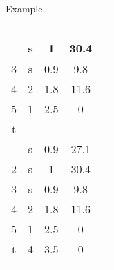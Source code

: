 \begin{frame}{Example}
\begin{columns}[c]
{\begin{tabular}{| c | c | c | c | c |}
{    2& s & 1 & 30.4\\ \hline
    3& s & 0.9 & 9.8\\ \hline
    4& 2 & 1.8 & 11.6\\ \hline
    5& 1 & 2.5 & 0\\ \hline
    t& & &\\ \hline
    }
    \only<14->{1& s & 0.9 & 27.1\\ \hline
    2& s & 1 & 30.4\\ \hline
    3& s & 0.9 & 9.8\\ \hline
    4& 2 & 1.8 & 11.6\\ \hline
    5& 1 & 2.5 & 0\\ \hline
    t & 4 & 3.5 & 0\\ \hline
    }


  \end{tabular}
}

\end{columns}
\end{frame}
